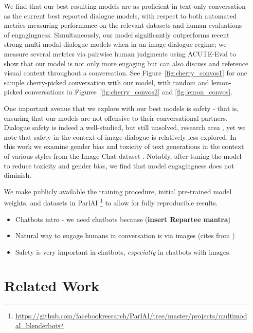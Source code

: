 \documentclass[11pt,a4paper]{article}
\begin{document}
We find that our best resulting models are as proficient in text-only conversation as the current best reported dialogue models, with respect to both automated metrics measuring performance on the relevant datasets and human evaluations of engagingness.
Simultaneously, our model significantly outperforms recent strong multi-modal dialogue models when in an image-dialogue regime; we measure several metrics via pairwise human judgments using ACUTE-Eval \cite{li2019acute} to show that our model is not only more engaging but can also discuss and reference visual context throughout a conversation. 
See Figure~\ref{fig:cherry_convos1} for one sample cherry-picked conversation with our model, with random and lemon-picked conversations in Figures~\ref{fig:cherry_convos2} and \ref{fig:lemon_convos}.

One important avenue that we explore with our best models is safety - that is, ensuring that our models are not offensive 
to their conversational partners.
Dialogue safety is indeed a well-studied, but still unsolved, research area
\cite{dinan2019safety,liu2019does,dinan2019queens,blodgett-etal-2020-language,ch2018detecting,schafer-burtenshaw-2019-offence, zhang-etal-2018-conversations-awry}, yet we note that safety in the context of image-dialogue is relatively less explored. 
In this work we examine gender bias and toxicity of text generations in the context of various  styles from the Image-Chat dataset \cite{shuster2020image}. Notably, after tuning the model to reduce toxicity and gender bias, we find that model engagingness does not diminish. 

We make publicly available the training procedure, initial pre-trained model weights, and datasets in ParlAI \footnote{\url{https://github.com/facebookresearch/ParlAI/tree/master/projects/multimodal_blenderbot}} to allow for fully reproducible results. 


\begin{itemize}
    \item Chatbots intro - we need chatbots because (\textbf{insert Repartee mantra})
    \item Natural way to engage humans in conversation is via images (cites from \cite{shuster2020image})
    \item Safety is very important in chatbots, \textit{especially} in chatbots with images.
\end{itemize}
\fi

\section{Related Work}
\end{document}
